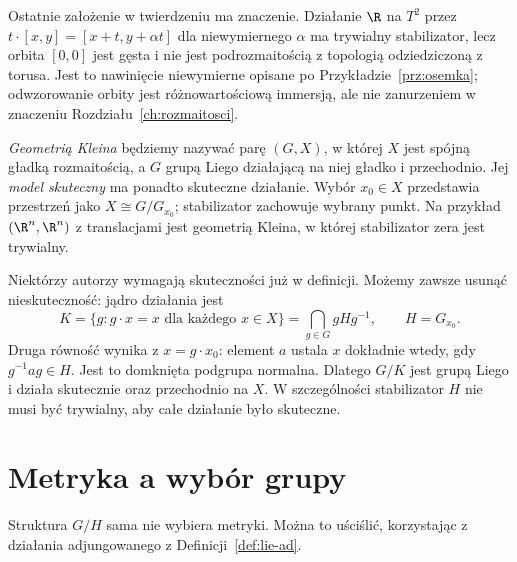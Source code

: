 Ostatnie założenie w twierdzeniu ma znaczenie. Działanie
$\R$ na $T^2$ przez
$t\cdot[x,y]=[x+t,y+\alpha t]$ dla niewymiernego $\alpha$
ma trywialny stabilizator, lecz orbita $[0,0]$ jest gęsta
i nie jest podrozmaitością z topologią odziedziczoną z torusa.
Jest to nawinięcie niewymierne opisane po
Przykładzie~\ref{prz:osemka}; odwzorowanie orbity jest
różnowartościową immersją, ale nie zanurzeniem w znaczeniu
Rozdziału~\ref{ch:rozmaitosci}.

\begin{definicja}
\label{def:klein-geometria}
\emph{Geometrią Kleina} będziemy nazywać parę $(G,X)$, w której
$X$ jest spójną gładką rozmaitością, a $G$ grupą Liego działającą
na niej gładko i przechodnio. Jej \emph{model skuteczny} ma ponadto
skuteczne działanie. Wybór $x_0\in X$ przedstawia przestrzeń jako
$X\cong G/G_{x_0}$; stabilizator zachowuje wybrany punkt.
Na przykład $(\R^n,\R^n)$ z translacjami jest geometrią Kleina,
w której stabilizator zera jest trywialny.
\end{definicja}

Niektórzy autorzy wymagają skuteczności już w definicji. Możemy
zawsze usunąć nieskuteczność: jądro działania jest
\begin{equation}\label{eq:klein-jadro}
 K=\{g:g\cdot x=x\text{ dla każdego }x\in X\}
   =\bigcap_{g\in G}gHg^{-1},\qquad H=G_{x_0}.
\end{equation}
Druga równość wynika z $x=g\cdot x_0$: element $a$ ustala
$x$ dokładnie wtedy, gdy $g^{-1}ag\in H$. Jest to domknięta
podgrupa normalna. Dlatego $G/K$ jest grupą Liego i działa
skutecznie oraz przechodnio na $X$. W szczególności stabilizator
$H$ nie musi być trywialny, aby całe działanie było skuteczne.

\section{Metryka a wybór grupy}
\label{sec:klein-metryka}

Struktura $G/H$ sama nie wybiera metryki. Można to uściślić,
korzystając z działania adjungowanego z
Definicji~\ref{def:lie-ad}.

